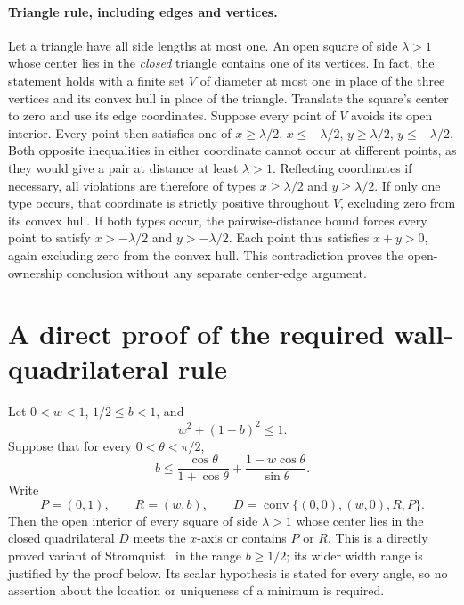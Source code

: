 \documentclass[11pt]{article}
\begin{document}
\paragraph{Triangle rule, including edges and vertices.}
Let a triangle have all side lengths at most one. An open square of
side $\lambda>1$ whose center lies in the \emph{closed} triangle
contains one of its vertices. In fact, the statement holds with a finite
set $V$ of diameter at most one in place of the three vertices and its
convex hull in place of the triangle.
Translate the square's center to zero and use its edge coordinates.
Suppose every point of $V$ avoids its open interior. Every point then
satisfies one of $x\ge\lambda/2$, $x\le-\lambda/2$,
$y\ge\lambda/2$, $y\le-\lambda/2$. Both opposite inequalities in either
coordinate cannot occur at different points, as they would give a pair
at distance at least $\lambda>1$. Reflecting coordinates if necessary,
all violations are therefore of types $x\ge\lambda/2$ and
$y\ge\lambda/2$.
If only one type occurs, that coordinate is strictly positive throughout
$V$, excluding zero from its convex hull. If both types occur, the
pairwise-distance bound forces every point to satisfy
$x> -\lambda/2$ and $y> -\lambda/2$. Each point thus satisfies $x+y>0$,
again excluding zero from the convex hull. This contradiction proves the
open-ownership conclusion without any separate center-edge argument.

\section*{A direct proof of the required wall-quadrilateral rule}
Let $0<w<1$, $1/2\le b<1$, and
\[
 w^2+(1-b)^2\le1.
\]
Suppose that for every $0<\theta<\pi/2$,
\begin{equation}\label{eq:independent-wall-hypothesis}
 b\le \frac{\cos\theta}{1+\cos\theta}
       +\frac{1-w\cos\theta}{\sin\theta}.
\end{equation}
Write
\[
 P=(0,1),\qquad R=(w,b),\qquad
 D=\operatorname{conv}\{(0,0),(w,0),R,P\}.
\]
Then the open interior of every square of side $\lambda>1$ whose center
lies in the closed quadrilateral $D$ meets the $x$-axis or contains $P$ or
$R$. This is a directly proved variant of Stromquist\textup{~\cite[Lemma~4, pp.~3--4]{stromquist}} in the range $b\ge1/2$; its wider width range is justified by the proof below. Its scalar hypothesis is stated for every angle, so no assertion about the location or uniqueness of a minimum is required.
\end{document}
